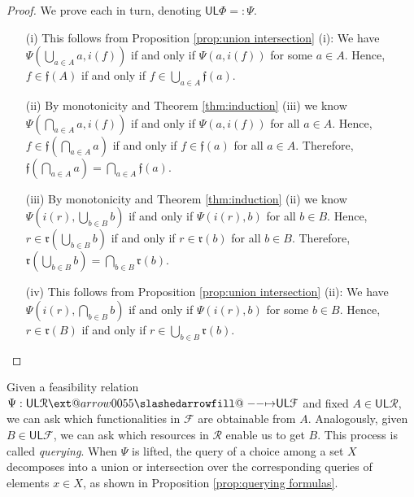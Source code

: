 \documentclass[12pt]{article}
\makeatletter
\theoremstyle{definition}
\theoremstyle{plain}
\theoremstyle{plain}
\theoremstyle{plain}
\theoremstyle{plain}
\theoremstyle{remark}
\theoremstyle{remark}
\newcommand{\mc}[1]{\mathcal{#1}}
\newcommand{\low}{\mathsf{L}}
\newcommand{\upper}{\mathsf{U}}
\def\slashedarrowfill@#1#2#3#4#5{%
	$\m@th\thickmuskip0mu\medmuskip\thickmuskip\thinmuskip\thickmuskip
	\relax#5#1\mkern-7mu%
	\cleaders\hbox{$#5\mkern-2mu#2\mkern-2mu$}\hfill
	\mathclap{#3}\mathclap{#2}%
	\cleaders\hbox{$#5\mkern-2mu#2\mkern-2mu$}\hfill
	\mkern-7mu#4$%
}
\def\rightslashedarrowfill@{%
	\slashedarrowfill@\relbar\relbar\mapstochar\rightarrow}
\newcommand\xslashedrightarrow[2][]{%
	\ext@arrow 0055{\rightslashedarrowfill@}{#1}{#2}}
\makeatother
\begin{document}
\begin{proof}We prove each in turn, denoting $\upper\low\Phi =: \Psi$.
	\begin{itemize}
		\item[(i)] This follows from Proposition \ref{prop:union intersection} (i): We have $\Psi(\bigcup_{a \in A} a, i(f))$ if and only if $\Psi(a, i(f))$ for some $a \in A$. Hence, $f \in \mathfrak{f}(A)$ if and only if $f \in \bigcup_{a \in A} \mathfrak{f}(a)$.
		
		\item[(ii)] By monotonicity and Theorem \ref{thm:induction} (iii) we know $\Psi(\bigcap_{a \in A} a, i(f))$ if and only if $\Psi(a,i(f))$ for all $a \in A$. Hence, $f \in \mathfrak{f}(\bigcap_{a \in A} a) $ if and only if $f \in \mathfrak{f}(a)$ for all $a \in A$. Therefore, $\mathfrak{f}(\bigcap_{a \in A} a) = \bigcap_{a \in A}\mathfrak{f}(a)$.
		
		\item[(iii)] By monotonicity and Theorem \ref{thm:induction} (ii) we know $\Psi(i(r),\bigcup_{b \in B} b)$ if and only if $\Psi(i(r),b)$ for all $b \in B$. Hence, $r \in \mathfrak{r}(\bigcup_{b \in B}b)$ if and only if $r \in \mathfrak{r}(b)$ for all $b \in B$. Therefore, $\mathfrak{r}(\bigcup_{b \in B} b) = \bigcap_{b \in B}\mathfrak{r}(b)$.
		
		\item[(iv)] This follows from Proposition \ref{prop:union intersection} (ii): We have $\Psi(i(r), \bigcap_{b \in B} b)$ if and only if $\Psi(i(r), b)$ for some $b \in B$. Hence, $r \in \mathfrak{r}(B)$ if and only if $r \in \bigcup_{b \in B} \mathfrak{r}(b)$.
	\end{itemize}
\end{proof}

\begin{tcolorbox}[title=Queries on Induced Feasibility, colframe=Apricot, colback = paleorange, coltitle = Sepia]
	Given a feasibility relation $\Psi: \upper\low\mc{R} \xslashedrightarrow{} \upper\low\mc{F}$ and fixed $A \in \upper\low\mc{R}$, we can ask which functionalities in $\mc{F}$ are obtainable from $A$. Analogously, given $B \in \upper\low\mc{F}$, we can ask which resources in $\mc{R}$ enable us to get $B$. 
	This process is called \emph{querying}. When $\Psi$ is lifted, the query of a choice among a set $X$ decomposes into a union or intersection over the corresponding queries of elements $x \in X$, as shown in Proposition \ref{prop:querying formulas}.
\end{tcolorbox}
\end{document}
